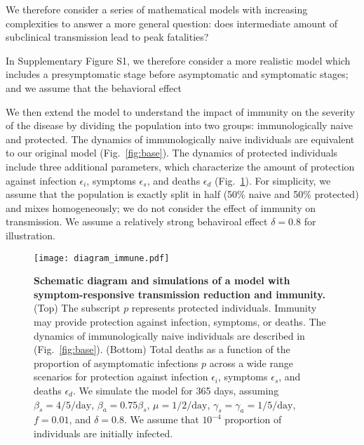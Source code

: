 \documentclass[12pt]{article}
\newcommand{\fref}[1]{Fig.~\ref{fig:#1}}
\begin{document}
We therefore consider a series of mathematical models with increasing complexities to answer a more general question:
does intermediate amount of subclinical transmission lead to peak fatalities?


In Supplementary Figure S1, we therefore consider a more realistic model which includes a presymptomatic stage before asymptomatic and symptomatic stages; and we assume that the behavioral effect


We then extend the model to understand the impact of immunity on the severity of the disease by dividing the population into two groups: immunologically naive and protected.
The dynamics of immunologically naive individuals are equivalent to our original model (\fref{base}).
The dynamics of protected individuals include three additional parameters, which characterize the amount of protection against infection $\epsilon_i$, symptoms $\epsilon_s$, and deaths $\epsilon_d$ (\fref{immune}).
For simplicity, we assume that the population is exactly split in half (50\% naive and 50\% protected) and mixes homogeneously; we do not consider the effect of immunity on transmission.
We assume a relatively strong behaviroal effect $\delta=0.8$ for illustration.

\begin{figure}[!ht]
\texttt{[image: diagram\_immune.pdf]}
\caption{
\textbf{Schematic diagram and simulations of a model with symptom-responsive transmission reduction and immunity.}
(Top) The subscript $p$ represents protected individuals. 
Immunity may provide protection against infection, symptoms, or deaths.
The dynamics of immunologically naive individuals are described in (\fref{base}).
(Bottom) Total deaths as a function of the proportion of asymptomatic infections $p$ across a wide range scenarios for protection against infection $\epsilon_i$, symptoms $\epsilon_s$, and deaths $\epsilon_d$.
We simulate the model for 365 days, assuming $\beta_s = 4/5/\mathrm{day}$, $\beta_a = 0.75 \beta_s$, $\mu=1/2/\mathrm{day}$, $\gamma_s=\gamma_a=1/5/\mathrm{day}$, $f=0.01$, and $\delta=0.8$.
We assume that $10^{-4}$ proportion of individuals are initially infected.
}
\label{fig:immune}
\end{figure}
\end{document}
